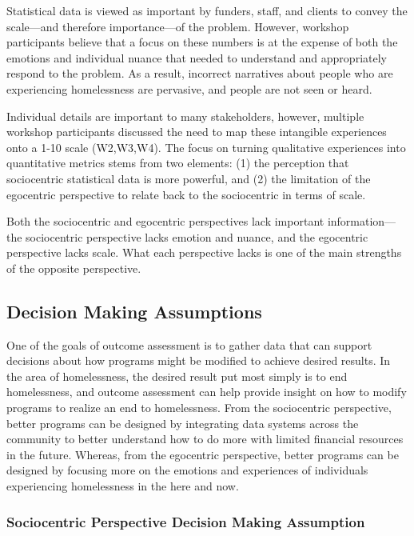 Statistical data is viewed as important by funders, staff, and clients to convey the scale---and therefore importance---of the problem. However, workshop participants believe that a focus on these numbers is at the expense of both the emotions and individual nuance that needed to understand and appropriately respond to the problem. As a result, incorrect narratives about people who are experiencing homelessness are pervasive, and people are not seen or heard.

Individual details are important to many stakeholders, however, multiple workshop participants discussed the need to map these intangible experiences onto a 1-10 scale (W2,W3,W4). The focus on turning qualitative experiences into quantitative metrics stems from two elements: (1) the perception that sociocentric statistical data is more powerful, and (2) the limitation of the egocentric perspective to relate back to the sociocentric in terms of scale. 

Both the sociocentric and egocentric perspectives lack important information---the sociocentric perspective lacks emotion and nuance, and the egocentric perspective lacks scale. What each perspective lacks is one of the main strengths of the opposite perspective.


\subsection{Decision Making Assumptions}
One of the goals of outcome assessment is to gather data that can support decisions about how programs might be modified to achieve desired results. In the area of homelessness, the desired result put most simply is to end homelessness, and outcome assessment can help provide insight on how to modify programs to realize an end to homelessness. From the sociocentric perspective, better programs can be designed by integrating data systems across the community to better understand how to do more with limited financial resources in the future. Whereas, from the egocentric perspective, better programs can be designed by focusing more on the emotions and experiences of individuals experiencing homelessness in the here and now.

\subsubsection{Sociocentric Perspective Decision Making Assumption}


